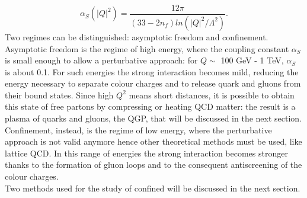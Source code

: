 %
\begin{equation}
 \alpha_{S}(|Q|^{2})= \frac{12\pi}{(33-2n_{f})ln(|Q|^{2} / \Lambda^{2})}.
 \label{eq:aqcd2}
\end{equation}
%
Two regimes can be distinguished: asymptotic freedom and confinement.\\
Asymptotic freedom is the regime of high energy, where the coupling constant $\alpha_{S}$ is small enough to allow a perturbative approach: for $Q \sim$ 100 GeV - 1 TeV, $\alpha_{S}$ is about 0.1. For such energies the strong interaction becomes mild, reducing the energy necessary to separate colour charges and to release quark and gluons from their bound states. Since high $Q^{2}$ means short distances, it is possible to obtain this state of free partons by compressing or heating QCD matter: the result is a plasma of quarks and gluons, the QGP, that will be discussed in the next section.\\
Confinement, instead, is the regime of low energy, where the perturbative approach is not valid anymore hence other theoretical methods must be used, like lattice QCD. In this range of energies the strong interaction becomes stronger thanks to the formation of gluon loops and to the consequent antiscreening of the colour charges.\\
Two methods used for the study of confined will be discussed in the next section.
%
